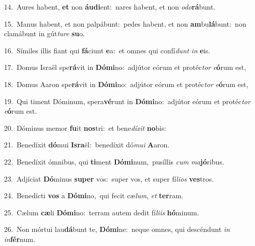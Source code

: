 {\numbfont\textcolor{\numbcolor}{14.}}~Aures habent, \textbf{et} non \textbf{áu}\-\textbf{di}ent:~\star nares habent, et non \textit{o}\-\textit{do}\textbf{rá}bunt.\par
{\numbfont\textcolor{\numbcolor}{15.}}~Manus habent, et non palpábunt:~\dagger pedes habent, et non \textbf{am}\-bu\-\textbf{lá}\-bunt:~\star non clamábunt in gút\-\textit{tu}\-\textit{re} \textbf{su}\-o.\par
{\numbfont\textcolor{\numbcolor}{16.}}~Símiles illis fiant qui \textbf{fá}\-ciunt \textbf{e}\-a:~\star et omnes qui confí\textit{dunt} \textit{in} \textbf{e}\-is.\par
{\numbfont\textcolor{\numbcolor}{17.}}~Domus Israël spe\-\textbf{rá}\-vit in \textbf{Dó}\-\textbf{mi}no:~\star adjútor eórum et protéc\textit{tor} \textit{e}\-\textbf{ó}rum est,\par
{\numbfont\textcolor{\numbcolor}{18.}}~Domus Aaron spe\-\textbf{rá}\-vit in \textbf{Dó}\-\textbf{mi}no:~\star adjútor eórum et protéc\textit{tor} \textit{e}\-\textbf{ó}rum est,\par
{\numbfont\textcolor{\numbcolor}{19.}}~Qui timent Dóminum, spera\-\textbf{vé}\-runt in \textbf{Dó}\-\textbf{mi}no:~\star adjútor eórum et protéc\textit{tor} \textit{e}\-\textbf{ó}rum est.\par
{\numbfont\textcolor{\numbcolor}{20.}}~Dóminus memor \textbf{fu}\-it \textbf{nos}\-tri:~\star et bene\-\textit{dí}\-\textit{xit} \textbf{no}\-bis:\par
{\numbfont\textcolor{\numbcolor}{21.}}~Benedíxit \textbf{dó}\-mui \textbf{Is}\-\textbf{ra}ël:~\star benedíxit dó\-\textit{mu}\-\textit{i} \textbf{A}\-aron.\par
{\numbfont\textcolor{\numbcolor}{22.}}~Benedíxit ómnibus, qui \textbf{ti}\-ment \textbf{Dó}\-\textbf{mi}num,~\star pusíllis \textit{cum} \textit{ma}\-\textbf{jó}ribus.\par
{\numbfont\textcolor{\numbcolor}{23.}}~Adjíciat \textbf{Dó}\-minus \textbf{su}\-\textbf{per} vos:~\star super vos, et super fí\-\textit{li}\-\textit{os} \textbf{ves}\-tros.\par
{\numbfont\textcolor{\numbcolor}{24.}}~Benedícti \textbf{vos} a \textbf{Dó}\-\textbf{mi}no,~\star qui fecit cæ\-\textit{lum}\-, \textit{et} \textbf{ter}\-ram.\par
{\numbfont\textcolor{\numbcolor}{25.}}~Cælum \textbf{cæ}\-li \textbf{Dó}\-\textbf{mi}no:~\star terram autem dedit fí\-\textit{li}\-\textit{is} \textbf{hó}\-minum.\par
{\numbfont\textcolor{\numbcolor}{26.}}~Non mórtui lau\-\textbf{dá}\-bunt te, \textbf{Dó}\-\textbf{mi}ne:~\star neque omnes, qui descéndunt \textit{in} \textit{in}\-\textbf{fér}num.\par
